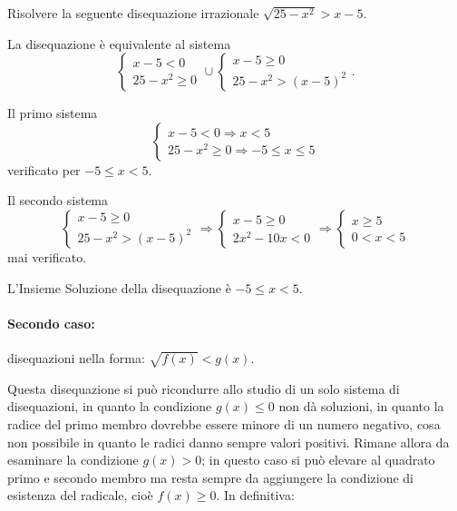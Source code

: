 \begin{exrig}
\begin{esempio}
Risolvere la seguente disequazione irrazionale $\sqrt{25-x^2}>x-5$.

La disequazione è equivalente al sistema 
\[\left\{\begin{array}{l}{x-5<0}\\{25-x^2\ge 0}\end{array}\right.\cup \left\{\begin{array}{l}x-5\ge 0\\25-x^2>(x-5)^2 \end{array}\right..\]

Il primo sistema 
\[\left\{\begin{array}{l}{x-5<0 \Rightarrow x<5}\\{25-x^2\ge 0 \Rightarrow -5\le x\le 5}\end{array}\right.\] verificato per $-5\le x< 5$.

Il secondo sistema \[\left\{\begin{array}{l}x-5\ge 0\\25-x^2>(x-5)^2\end{array}\right.\Rightarrow \left\{\begin{array}{l}x-5\ge 0\\2x^2-10x<0\end{array}\right.\Rightarrow \left\{\begin{array}{l}x\ge 5\\0<x<5\end{array}\right.\] mai verificato.

\begin{center}
 
\end{center}
L'Insieme Soluzione della disequazione è $-5\le x< 5$.
\end{esempio}
\end{exrig}

\paragraph{Secondo caso:} disequazioni nella forma: $ {\sqrt{f(x)}<g(x)} $.

Questa disequazione si può ricondurre allo studio di un solo sistema di disequazioni, in quanto la condizione $g(x)\le 0$ non dà soluzioni, in quanto la radice del primo membro dovrebbe essere minore di un numero negativo, cosa non possibile in quanto le radici danno sempre valori positivi. Rimane allora da esaminare la condizione $ g(x)>0 $; in questo caso si può elevare al quadrato primo e secondo membro ma resta sempre da aggiungere la condizione di esistenza del radicale, cioè $f(x)\ge 0$. In definitiva:

